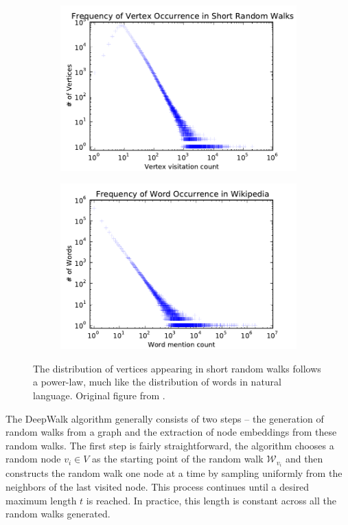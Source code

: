 \begin{figure}
	\begin{subfigure}{0.49\linewidth}
		\includegraphics[width=\linewidth]{images/deepwalk-motivation/youtube-powerlaw.pdf}
	\end{subfigure}
	\begin{subfigure}{0.49\linewidth}
		\includegraphics[width=\linewidth]{images/deepwalk-motivation/wiki-powerlaw.pdf}
	\end{subfigure}
	\caption{The distribution of vertices appearing in short random walks follows a power-law, much like the distribution of words in natural language. Original figure from \cite{perozzi_deepwalk_2014}.}
	\label{fig:deepwalk-motivation}
\end{figure}

The DeepWalk algorithm generally consists of two steps -- the generation of random walks from a graph and the extraction of node embeddings from these random walks. The first step is fairly straightforward, the algorithm chooses a random node \( v_i \in V \) as the starting point of the random walk \( \mathcal{W}_{v_i} \) and then constructs the random walk one node at a time by sampling uniformly from the neighbors of the last visited node. This process continues until a desired maximum length \( t \) is reached. In practice, this length is constant across all the random walks generated.

